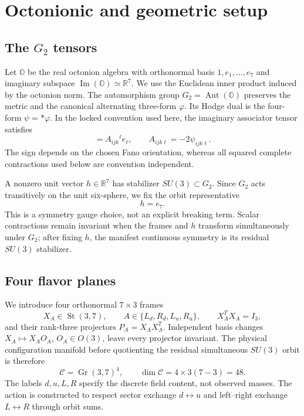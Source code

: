 \documentclass[11pt]{article}
\newcommand{\OO}{\mathbb O}
\newcommand{\RR}{\mathbb R}
\newcommand{\Gr}{\operatorname{Gr}}
\newcommand{\St}{\operatorname{St}}
\begin{document}
\section{Octonionic and geometric setup}

\subsection{The $G_2$ tensors}

Let $\OO$ be the real octonion algebra with orthonormal basis $1,e_1,\ldots,e_7$ and imaginary subspace $\operatorname{Im}(\OO)\simeq\RR^7$.  We use the Euclidean inner product induced by the octonion norm.  The automorphism group $G_2=\operatorname{Aut}(\OO)$ preserves the metric and the canonical alternating three-form $\varphi$.  Its Hodge dual is the four-form $\psi=*\varphi$.  In the locked convention used here, the imaginary associator tensor satisfies
\begin{equation}
  [e_i,e_j,e_k]=A_{ijk}{}^{\ell}e_\ell,
  \qquad A_{ijk\ell}=-2\psi_{ijk\ell}.
  \label{eq:Atensor}
\end{equation}
The sign depends on the chosen Fano orientation, whereas all squared complete contractions used below are convention independent.

A nonzero unit vector $h\in\RR^7$ has stabilizer $SU(3)\subset G_2$.  Since $G_2$ acts transitively on the unit six-sphere, we fix the orbit representative
\begin{equation}
  h=e_7.
\end{equation}
This is a symmetry gauge choice, not an explicit breaking term.  Scalar contractions remain invariant when the frames and $h$ transform simultaneously under $G_2$; after fixing $h$, the manifest continuous symmetry is its residual $SU(3)$ stabilizer.

\subsection{Four flavor planes}

We introduce four orthonormal $7\times3$ frames
\begin{equation}
  X_A\in\St(3,7),\qquad
  A\in\{L_d,R_d,L_u,R_u\},
  \qquad X_A^T X_A=I_3,
\end{equation}
and their rank-three projectors $P_A=X_AX_A^T$.  Independent basis changes $X_A\mapsto X_AO_A$, $O_A\in O(3)$, leave every projector invariant.  The physical configuration manifold before quotienting the residual simultaneous $SU(3)$ orbit is therefore
\begin{equation}
  \mathcal C=\Gr(3,7)^4,
  \qquad \dim\mathcal C=4\times3(7-3)=48.
  \label{eq:configspace}
\end{equation}
The labels $d,u,L,R$ specify the discrete field content, not observed masses.  The action is constructed to respect sector exchange $d\leftrightarrow u$ and left--right exchange $L\leftrightarrow R$ through orbit sums.
\end{document}
